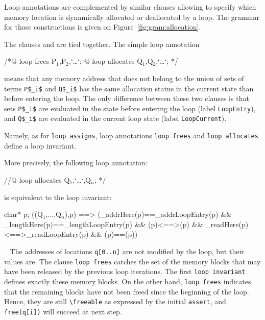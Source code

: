 Loop annotations are complemented by similar clauses allowing to specify which 
memory location 
is dynamically allocated or deallocated by a loop.
The grammar for those constructions is given on
 Figure~\ref{fig:gram:allocation}.

The clauses \Loop \allocates and \Loop \frees are tied together.
The simple loop annotation
\begin{listing-nonumber}
/*@ loop frees P$_1$,P$_2$,`\dots`;
  @ loop allocates Q$_1$,Q$_2$,`\dots`; */
\end{listing-nonumber}
means that any memory address that does not belong to the union of sets of 
terms
\lstinline|P$_i$| and  \lstinline|Q$_i$|
has the same allocation status in the current state than 
before entering the loop. 
The only difference between these two clauses is that sets 
\lstinline|P$_i$| are evaluated in the state before entering the loop
(label \lstinline|LoopEntry|), 
and \lstinline|Q$_i$| are evaluated in the current loop state 
(label \lstinline|LoopCurrent|).

Namely, as for \lstinline|loop assigns|, loop annotations
\lstinline|loop frees| and \lstinline|loop allocates| define a loop invariant.

More precisely, the following loop annotation:
\begin{listing-nonumber}
//@ loop allocates Q$_1$,`\dots`,Q$_n$; */
\end{listing-nonumber}
is equivalent to the loop invariant:
\begin{listing-nonumber}
\forall char* p; 
\separated(\union(Q$_1$,$\ldots$,Q$_n$),p) ==>
   (\base_addr{Here}(p)==\base_addr{LoopEntry}(p)
    && \block_length{Here}(p)==\block_length{LoopEntry}(p)
    && (p)<==>(p)
    && \valid_read{Here}(p)<==>\valid_read{LoopEntry}(p)
    && (p)==(p))
\end{listing-nonumber}

\begin{example}
~
The addresses of locations \lstinline|q[0..n]| are not modified by the loop,
but their values are.
The clause \lstinline|loop frees| catches the set of the memory blocks 
that may have been released by the previous loop iterations.
The first \lstinline|loop invariant| defines exactly these memory blocks.
On the other hand, \lstinline|loop frees| indicates that the remaining blocks
have not been freed since the beginning of the loop. Hence, they are still
\lstinline|\freeable| as expressed by the initial \lstinline|assert|, and
\lstinline|free(q[i])| will succeed at next step.
\end{example}

